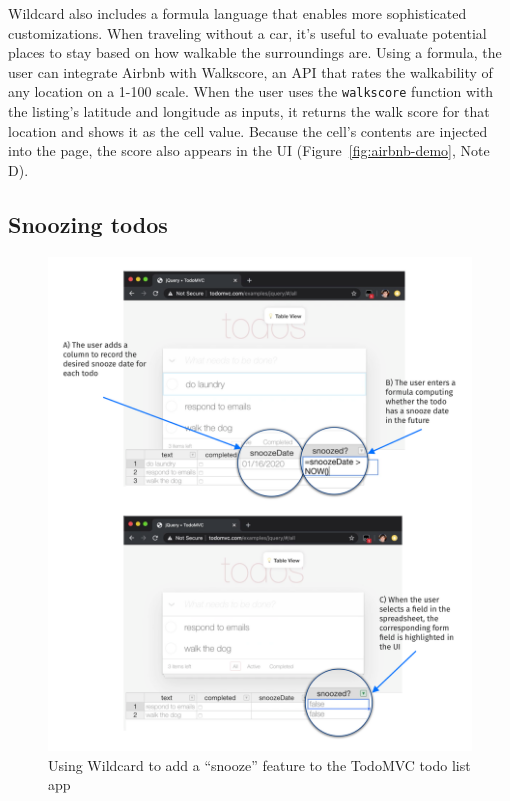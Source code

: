\documentclass[english,submission]{programming}
\begin{document}
Wildcard also includes a formula language that enables more
sophisticated customizations. When traveling without a car, it's useful
to evaluate potential places to stay based on how walkable the
surroundings are. Using a formula, the user can integrate Airbnb with
Walkscore, an API that rates the walkability of any location on a 1-100
scale. When the user uses the \texttt{walkscore} function with the
listing's latitude and longitude as inputs, it returns the walk score
for that location and shows it as the cell value. Because the cell's
contents are injected into the page, the score also appears in the UI{
(Figure~\ref{fig:airbnb-demo}, Note D)}.

\hypertarget{snoozing-todos}{%
\subsection{Snoozing todos}\label{snoozing-todos}}

\begin{figure}
\hypertarget{fig:todomvc-demo}{%
\centering
\includegraphics{media/todomvc-demo-300dpi.png}
\caption{Using Wildcard to add a ``snooze'' feature to the TodoMVC todo
list app}\label{fig:todomvc-demo}
}
\end{figure}
\end{document}
